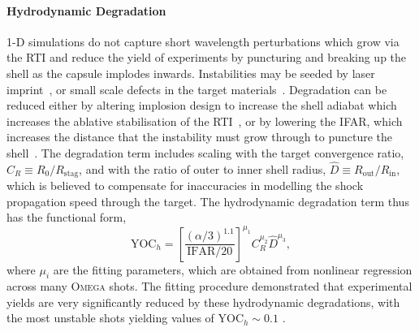 \paragraph*{Hydrodynamic Degradation}
1-D simulations do not capture short wavelength perturbations which grow via the \ac{RTI} and reduce the yield of experiments by puncturing and breaking up the shell as the capsule implodes inwards.
Instabilities may be seeded by laser imprint~\cite{hu_mitigating_2012,karasik_suppression_2015,hu_mitigating_2018}, or small scale defects in the target materials~\cite{dittrich_diagnosis_1994,miller_instability_2022}.
Degradation can be reduced either by altering implosion design to increase the shell adiabat which increases the ablative stabilisation of the \ac{RTI}~\cite{macphee_stabilization_2015,smalyuk_mix_2017}, or by lowering the \ac{IFAR}, which increases the distance that the instability must grow through to puncture the shell~\cite{haines_robustness_2019}.
The degradation term includes scaling with the target convergence ratio, $C_R\equiv R_0/R_{\text{stag}}$, and with the ratio of outer to inner shell radius, $\hat{D}\equiv R_{\text{out}}/R_{\text{in}}$, which is believed to compensate for inaccuracies in modelling the shock propagation speed through the target.
The hydrodynamic degradation term thus has the functional form,
\begin{equation}
    \text{YOC}_h = \left[ \frac{\left( \alpha/3 \right)^{1.1}}{\text{IFAR}/20} \right]^{\mu_1} C_R^{\mu_2} \hat{D}^{\mu_3},
\end{equation}
where $\mu_i$ are the fitting parameters, which are obtained from nonlinear regression across many \textsc{Omega} shots.
The fitting procedure demonstrated that experimental yields are very significantly reduced by these hydrodynamic degradations, with the most unstable shots yielding values of $\text{YOC}_h\sim 0.1$ \cite{lees_understanding_2023}.

